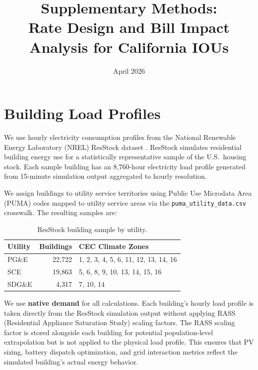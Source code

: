 \documentclass[11pt]{article}
\title{Supplementary Methods:\\Rate Design and Bill Impact Analysis for California IOUs}
\author{}
\date{April 2026}
\begin{document}
\maketitle
\tableofcontents
\newpage

\section{Building Load Profiles}
\label{sec:load_profiles}

We use hourly electricity consumption profiles from the National Renewable Energy Laboratory (NREL) ResStock dataset \cite{resstock2024}. ResStock simulates residential building energy use for a statistically representative sample of the U.S.\ housing stock. Each sample building has an 8,760-hour electricity load profile generated from 15-minute simulation output aggregated to hourly resolution.

We assign buildings to utility service territories using Public Use Microdata Area (PUMA) codes mapped to utility service areas via the \texttt{puma\_utility\_data.csv} crosswalk. The resulting samples are:

\begin{table}[htbp]
\centering
\caption{ResStock building sample by utility.}
\label{tab:sample}
\begin{tabular}{l r l}
\toprule
\textbf{Utility} & \textbf{Buildings} & \textbf{CEC Climate Zones} \\
\midrule
PG\&E & 22,722 & 1, 2, 3, 4, 5, 6, 11, 12, 13, 14, 16 \\
SCE & 19,863 & 5, 6, 8, 9, 10, 13, 14, 15, 16 \\
SDG\&E & 4,317 & 7, 10, 14 \\
\bottomrule
\end{tabular}
\end{table}

We use \textbf{native demand} for all calculations. Each building's hourly load profile is taken directly from the ResStock simulation output without applying RASS (Residential Appliance Saturation Study) scaling factors. The RASS scaling factor is stored alongside each building for potential population-level extrapolation but is not applied to the physical load profile. This ensures that PV sizing, battery dispatch optimization, and grid interaction metrics reflect the simulated building's actual energy behavior.
\end{document}
